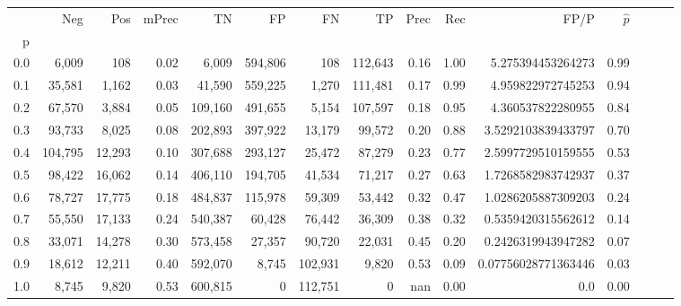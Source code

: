 \begin{tabular}{rrrrrrrrrrrrrrr}
\toprule
{} &      Neg &     Pos & mPrec &       TN &       FP &       FN &       TP &  Prec &   Rec &                 FP/P & $\hat{p}$ \\
p   &          &         &       &          &          &          &          &       &       &                      &           \\
\midrule
0.0 &    6,009 &     108 &  0.02 &    6,009 &  594,806 &      108 &  112,643 &  0.16 &  1.00 &    5.275394453264273 &      0.99 \\
0.1 &   35,581 &   1,162 &  0.03 &   41,590 &  559,225 &    1,270 &  111,481 &  0.17 &  0.99 &    4.959822972745253 &      0.94 \\
0.2 &   67,570 &   3,884 &  0.05 &  109,160 &  491,655 &    5,154 &  107,597 &  0.18 &  0.95 &    4.360537822280955 &      0.84 \\
0.3 &   93,733 &   8,025 &  0.08 &  202,893 &  397,922 &   13,179 &   99,572 &  0.20 &  0.88 &   3.5292103839433797 &      0.70 \\
0.4 &  104,795 &  12,293 &  0.10 &  307,688 &  293,127 &   25,472 &   87,279 &  0.23 &  0.77 &   2.5997729510159555 &      0.53 \\
0.5 &   98,422 &  16,062 &  0.14 &  406,110 &  194,705 &   41,534 &   71,217 &  0.27 &  0.63 &   1.7268582983742937 &      0.37 \\
0.6 &   78,727 &  17,775 &  0.18 &  484,837 &  115,978 &   59,309 &   53,442 &  0.32 &  0.47 &   1.0286205887309203 &      0.24 \\
0.7 &   55,550 &  17,133 &  0.24 &  540,387 &   60,428 &   76,442 &   36,309 &  0.38 &  0.32 &   0.5359420315562612 &      0.14 \\
0.8 &   33,071 &  14,278 &  0.30 &  573,458 &   27,357 &   90,720 &   22,031 &  0.45 &  0.20 &   0.2426319943947282 &      0.07 \\
0.9 &   18,612 &  12,211 &  0.40 &  592,070 &    8,745 &  102,931 &    9,820 &  0.53 &  0.09 &  0.07756028771363446 &      0.03 \\
1.0 &    8,745 &   9,820 &  0.53 &  600,815 &        0 &  112,751 &        0 &   nan &  0.00 &                  0.0 &      0.00 \\
\bottomrule
\end{tabular}
